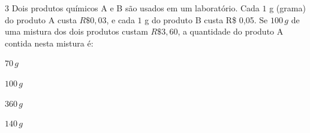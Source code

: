 
\num{3}  Dois produtos químicos A e B são usados em um laboratório. Cada $1$ g
(grama) do produto A custa $R\$0,03$, e cada $1$ g do produto B custa R\$
0,05. Se $100\,g$ de uma mistura dos dois produtos custam $R\$3,60$, a
quantidade do produto A contida nesta mistura é:

\begin{escolha}
\item $70\,g$
\item $100\,g$
\item $360\,g$
\item $140\,g$
\end{escolha}



